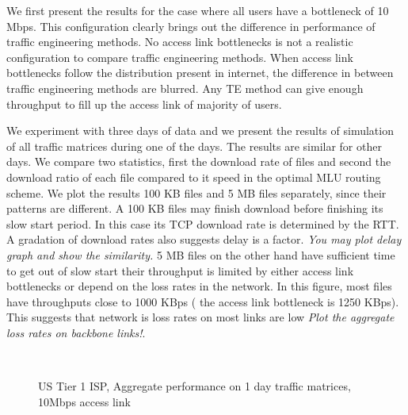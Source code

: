 \documentclass[a4paper,10pt]{article}
\begin{document}
We first present the results for the case where all users have a bottleneck of 10 Mbps. This configuration clearly brings out the difference in performance of traffic engineering methods. No access link bottlenecks is not a realistic configuration to compare traffic engineering methods. When access link bottlenecks follow the distribution present in internet,  the difference in between traffic engineering methods are blurred. Any TE method can give enough throughput to fill up the access link of majority of users. 

We experiment with three days of data and we present the results of simulation of all traffic matrices during one of the days. The results are similar for other days. We compare two statistics, first the download rate of files and second the download ratio of each file compared to it speed in the optimal MLU routing scheme. We plot the results 100 KB files and 5 MB files separately, since their patterns are different. A 100 KB files may finish download before finishing its slow start period. In this case its TCP download rate is determined by the RTT. A gradation of download rates also suggests delay is a factor. \emph{You may plot delay graph and show the similarity.} 5 MB files on the other hand have sufficient time to get out of slow start their throughput is limited by either access link bottlenecks or depend on the loss rates in the network. In this figure, most files have throughputs close to 1000 KBps ( the access link bottleneck is 1250 KBps). This suggests that  network is loss rates on most links are low \emph{Plot the aggregate loss rates on backbone links!}.  


\begin{figure}[htp]
  \begin{center}
     \\
  \end{center}
  \caption{US Tier 1 ISP, Aggregate performance on 1 day traffic matrices, 10Mbps access link}
  \label{fig:usisp_aggregate}
\end{figure}
\end{document}
